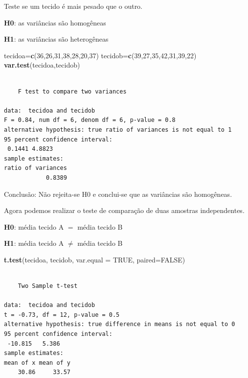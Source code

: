 \documentclass[12pt,brazil,]{book}
\newenvironment{Shaded}{\begin{snugshade}}{\end{snugshade}}
\newcommand{\DataTypeTok}[1]{\textcolor[rgb]{0.13,0.29,0.53}{#1}}
\newcommand{\DecValTok}[1]{\textcolor[rgb]{0.00,0.00,0.81}{#1}}
\newcommand{\KeywordTok}[1]{\textcolor[rgb]{0.13,0.29,0.53}{\textbf{#1}}}
\newcommand{\NormalTok}[1]{#1}
\newcommand{\OtherTok}[1]{\textcolor[rgb]{0.56,0.35,0.01}{#1}}
\begin{document}
Teste se um tecido é mais pesado que o outro.

\textbf{H0}: as variâncias são homogêneas

\textbf{H1}: as variâncias são heterogêneas

\begin{Shaded}
\begin{Highlighting}[]
\NormalTok{tecidoa=}\KeywordTok{c}\NormalTok{(}\DecValTok{36}\NormalTok{,}\DecValTok{26}\NormalTok{,}\DecValTok{31}\NormalTok{,}\DecValTok{38}\NormalTok{,}\DecValTok{28}\NormalTok{,}\DecValTok{20}\NormalTok{,}\DecValTok{37}\NormalTok{)}
\NormalTok{tecidob=}\KeywordTok{c}\NormalTok{(}\DecValTok{39}\NormalTok{,}\DecValTok{27}\NormalTok{,}\DecValTok{35}\NormalTok{,}\DecValTok{42}\NormalTok{,}\DecValTok{31}\NormalTok{,}\DecValTok{39}\NormalTok{,}\DecValTok{22}\NormalTok{)}
\KeywordTok{var.test}\NormalTok{(tecidoa,tecidob)}
\end{Highlighting}
\end{Shaded}

\begin{verbatim}

    F test to compare two variances

data:  tecidoa and tecidob
F = 0.84, num df = 6, denom df = 6, p-value = 0.8
alternative hypothesis: true ratio of variances is not equal to 1
95 percent confidence interval:
 0.1441 4.8823
sample estimates:
ratio of variances 
            0.8389 
\end{verbatim}

Conclusão: Não rejeita-se H0 e conclui-se que as variâncias são
homogêneas.

Agora podemos realizar o teste de comparação de duas amostras
independentes.

\textbf{H0}: média tecido A \(=\) média tecido B

\textbf{H1}: média tecido A \(\neq\) média tecido B

\begin{Shaded}
\begin{Highlighting}[]
\KeywordTok{t.test}\NormalTok{(tecidoa, tecidob, }\DataTypeTok{var.equal =} \OtherTok{TRUE}\NormalTok{, }\DataTypeTok{paired=}\OtherTok{FALSE}\NormalTok{)}
\end{Highlighting}
\end{Shaded}

\begin{verbatim}

    Two Sample t-test

data:  tecidoa and tecidob
t = -0.73, df = 12, p-value = 0.5
alternative hypothesis: true difference in means is not equal to 0
95 percent confidence interval:
 -10.815   5.386
sample estimates:
mean of x mean of y 
    30.86     33.57 
\end{verbatim}
\end{document}
